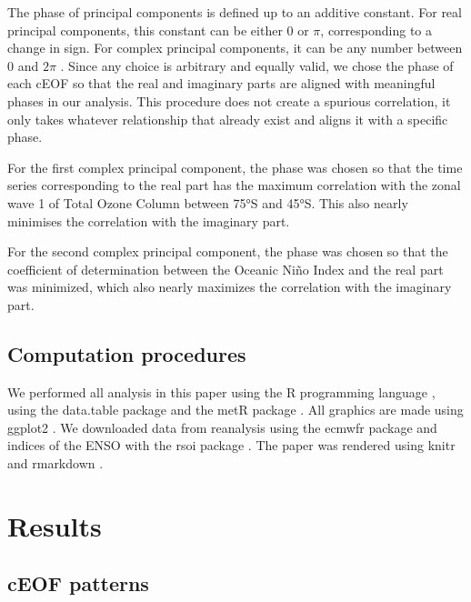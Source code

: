 \documentclass[smallextended]{svjour3}       %
\begin{document}
The phase of principal components is defined up to an additive constant. For real principal components, this constant can be either 0 or \(\pi\), corresponding to a change in sign. For complex principal components, it can be any number between 0 and \(2\pi\) \citep{horel1984}. Since any choice is arbitrary and equally valid, we chose the phase of each cEOF so that the real and imaginary parts are aligned with meaningful phases in our analysis. This procedure does not create a spurious correlation, it only takes whatever relationship that already exist and aligns it with a specific phase.



For the first complex principal component, the phase was chosen so that the time series corresponding to the real part has the maximum correlation with the zonal wave 1 of Total Ozone Column between 75°S and 45°S. This also nearly minimises the correlation with the imaginary part.

For the second complex principal component, the phase was chosen so that the coefficient of determination between the Oceanic Niño Index \citep{bamston1997} and the real part was minimized, which also nearly maximizes the correlation with the imaginary part.

\hypertarget{computation-procedures}{%
\subsection{Computation procedures}\label{computation-procedures}}

We performed all analysis in this paper using the R programming language \citep{rcoreteam2020}, using the data.table package \citep{dowle2020} and the metR package \citep{campitelli2020}. All graphics are made using ggplot2 \citep{wickham2009}. We downloaded data from reanalysis using the ecmwfr package \citep{hufkens2020} and indices of the ENSO with the rsoi package \citep{albers2020}. The paper was rendered using knitr and rmarkdown \citep{xie2015, allaire2019}.

\hypertarget{results}{%
\section{Results}\label{results}}

\hypertarget{ceof-patterns}{%
\subsection{cEOF patterns}\label{ceof-patterns}}
\end{document}
